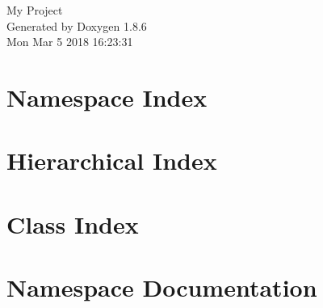 \documentclass[twoside]{book}
\newcommand{\clearemptydoublepage}{%
  \newpage{\pagestyle{empty}\cleardoublepage}%
}
\begin{document}
\hypersetup{pageanchor=false}
\begin{titlepage}
\vspace*{7cm}
\begin{center}%
{\Large My Project }\\
\vspace*{1cm}
{\large Generated by Doxygen 1.8.6}\\
\vspace*{0.5cm}
{\small Mon Mar 5 2018 16:23:31}\\
\end{center}
\end{titlepage}
\clearemptydoublepage
\tableofcontents
\clearemptydoublepage
{}
\hypersetup{pageanchor=true}

\chapter{Namespace Index}

\chapter{Hierarchical Index}

\chapter{Class Index}

\chapter{Namespace Documentation}


\end{document}
